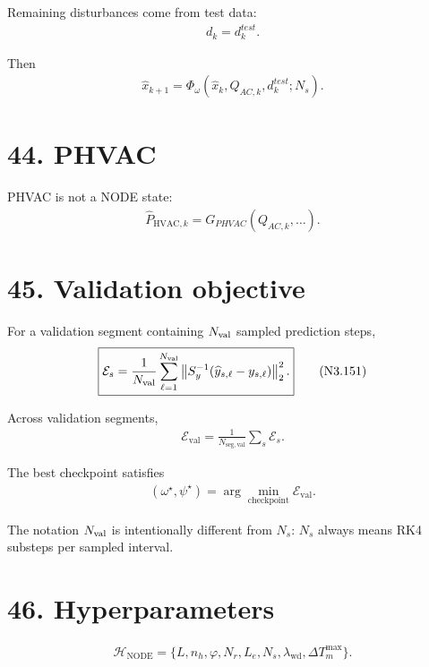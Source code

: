 \documentclass[11pt]{article}
\begin{document}
Remaining disturbances come from test data:
\begin{align}
\boxed{d_k=d_k^{test}.}
\tag{N3.148}
\end{align}

Then
\begin{align}
\boxed{
\widehat x_{k+1}
=
\Phi_\omega
(\widehat x_k,Q_{AC,k},d_k^{test};N_s).
}
\tag{N3.149}
\end{align}

\section*{44. PHVAC}

PHVAC is not a NODE state:
\begin{align}
\boxed{
\widehat P_{\mathrm{HVAC},k}
=
G_{PHVAC}(Q_{AC,k},\ldots).
}
\tag{N3.150}
\end{align}

\section*{45. Validation objective}

For a validation segment containing \(N_{\rm val}\) sampled prediction steps,
\begin{align}
\boxed{
\mathcal E_s
=
\frac{1}{N_{\rm val}}
\sum_{\ell=1}^{N_{\rm val}}
\left\|
S_y^{-1}
(\widehat y_{s,\ell}-y_{s,\ell})
\right\|_2^2.
}
\tag{N3.151}
\end{align}

Across validation segments,
\begin{align}
\boxed{
\mathcal E_{\mathrm{val}}
=
\frac{1}{N_{\mathrm{seg,val}}}
\sum_s\mathcal E_s.
}
\tag{N3.152}
\end{align}

The best checkpoint satisfies
\begin{align}
\boxed{
(\omega^\star,\psi^\star)
=
\arg\min_{\text{checkpoint}}
\mathcal E_{\mathrm{val}}.
}
\tag{N3.153}
\end{align}

The notation \(N_{\rm val}\) is intentionally different from \(N_s\): \(N_s\) always means RK4 substeps per sampled interval.

\section*{46. Hyperparameters}

\begin{align}
\boxed{
\mathcal H_{\mathrm{NODE}}
=
\{
L,
n_h,
\varphi,
N_r,
L_e,
N_s,
\lambda_{\mathrm{wd}},
\Delta T_m^{\max}
\}.
}
\tag{N3.154}
\end{align}
\end{document}
